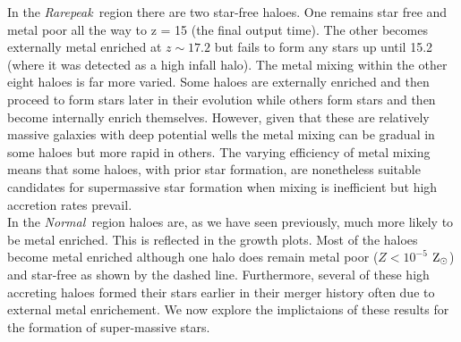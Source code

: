 \documentclass[graphics, twocolumn, usenatbib]{mn2e}
\newcommand{\zsolarc} {$\rm{Z_{\odot}}$}
\newcommand{\rarepeak} {\textit{Rarepeak~}}
\newcommand{\normal} {\textit{Normal~}}
\begin{document}
\indent In the \rarepeak region there are two
star-free haloes. One remains star free and metal poor all the way to z = 15 (the final output time).
The other becomes externally metal enriched at $z \sim 17.2$ but fails to form any stars up until 15.2
(where it was detected as a high infall halo). The metal mixing within the other eight haloes is far
more varied. Some haloes are externally enriched and then proceed to form stars later in their
evolution while others form stars and then become internally enrich themselves. 
However, given that these are relatively massive galaxies with deep potential wells
the metal mixing can be gradual in some haloes but more rapid in others. The varying efficiency of
metal mixing means that some haloes, with prior star formation, are nonetheless suitable candidates
for supermassive star formation when mixing is inefficient but high accretion rates prevail. \\
\indent In the \normal region haloes are, as we have seen previously, much more likely to be
metal enriched. This is reflected in the growth plots. Most of the haloes become metal enriched
although one halo does remain metal poor ($Z < 10^{-5}$ \zsolarc) and star-free as shown by the dashed
line. Furthermore, several of these high accreting haloes formed their stars earlier in their merger
history often due to external metal enrichement. We now explore the implictaions of these results for
the formation of super-massive stars. 
\end{document}
